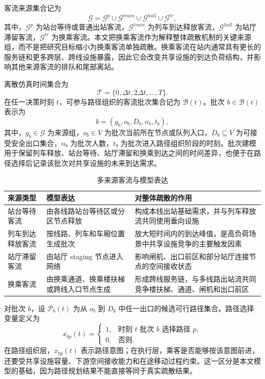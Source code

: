 \documentclass[UTF8,a4paper,12pt]{ctexart}
\begin{document}
客流来源集合记为
\[
\mathcal G=\mathcal G^{p}\cup \mathcal G^{train}\cup \mathcal G^{hall}\cup \mathcal G^{tr},
\]
其中，\(\mathcal G^{p}\) 为站台等待或普通出站客流，\(\mathcal G^{train}\) 为列车到达释放客流，\(\mathcal G^{hall}\) 为站厅滞留客流，\(\mathcal G^{tr}\) 为换乘客流。本文把换乘客流作为解释整体疏散机制的关键来源组，而不是把研究目标缩小为换乘客流单独疏散。换乘客流在站内通常具有更长的服务链和更多跨层、跨线设施暴露，因此它会改变共享设施的到达负荷结构，并影响其他来源客流的排队和尾部离站。

离散仿真时间集合为
\[
\mathcal T=\{0,\Delta t,2\Delta t,\ldots,T\}.
\]
在任一决策时刻 \(t\)，可参与路径组织的客流批次集合记为 \(\mathcal B(t)\)。批次 \(b\in\mathcal B(t)\) 表示为
\[
b=(g_b,o_b,D_b,n_b,t_b),
\]
其中，\(g_b\in\mathcal G\) 为来源组，\(o_b\in V\) 为批次当前所在节点或队列入口，\(D_b\subseteq V\) 为可接受安全出口集合，\(n_b\) 为批次人数，\(t_b\) 为批次进入路径组织阶段的时刻。批次建模用于保留列车释放、站台等待、站厅滞留和换乘到达之间的时间差异，也便于在路径选择后记录该批次对共享设施的未来到达需求。

\begin{table}[htbp]
\centering
\caption{多来源客流与模型表达}
\small
\begin{tabular}{p{}p{}p{}}
\toprule
来源类型 & 模型表达 & 对整体疏散的作用 \\
\midrule
站台等待客流 & 由各线路站台等待区或分区节点释放 & 构成本线出站基础需求，并与列车释放流共同使用垂向设施 \\
列车到达释放客流 & 按线路、列车和车厢位置生成批次 & 放大短时间内的到达峰值，是高负荷场景中共享设施竞争的主要触发因素 \\
站厅滞留客流 & 由站厅 staging 节点进入网络 & 影响闸机、出口前区和部分站厅连接节点的空间接收状态 \\
换乘客流 & 由换乘通道、换乘楼扶梯或跨线入口节点生成 & 形成跨线服务链，与多线路出站流共同竞争楼扶梯、通道、闸机和出口前区 \\
\bottomrule
\end{tabular}
\end{table}

对批次 \(b\)，设 \(\mathcal P_b(t)\) 为从 \(o_b\) 到 \(D_b\) 中任一出口的候选可行路径集合。路径选择变量定义为
\[
x_{bp}(t)=
\begin{cases}
1, & \text{时刻 }t\text{ 批次 }b\text{ 选择路径 }p,\\
0, & \text{否则}.
\end{cases}
\]
在路径组织层，\(x_{bp}(t)\) 表示路径意图；在执行层，乘客是否能够按该意图前进，还要受共享设施容量、下游空间接收能力和在途移动过程约束。这一区分是本文模型的基础，因为路径规划结果不能直接等同于真实疏散结果。
\end{document}
